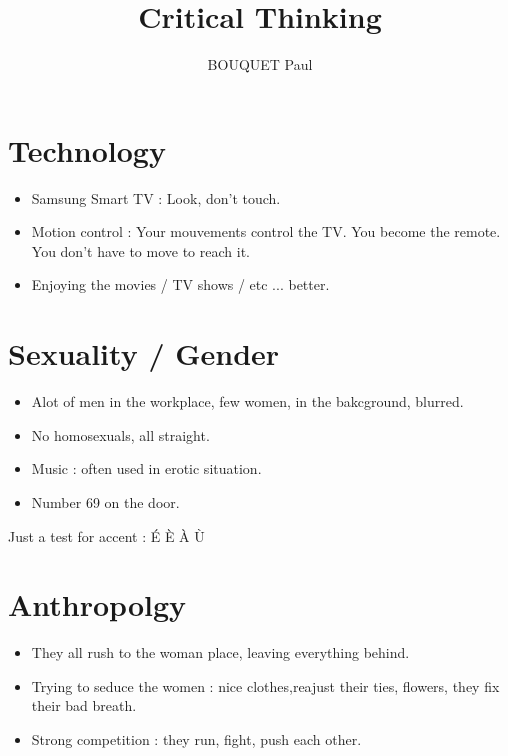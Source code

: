\documentclass{article}
\title{Critical Thinking}
\author{BOUQUET Paul}
\date{\vspace{-5ex}}
\begin{document}
\maketitle

\section{Technology}

\begin{itemize}

\item Samsung Smart TV : Look, don't touch.

\item Motion control : Your mouvements control the TV. You become the remote.
You don't have to move to reach it.

\item Enjoying the movies / TV shows / etc ... better.

\end{itemize}

\section{Sexuality / Gender}

\begin{itemize}

\item Alot of men in the workplace, few women, in the bakcground, blurred.

\item No homosexuals, all straight.

\item Music : often used in erotic situation.

\item Number 69 on the door.

\end{itemize}

Just a test for accent : É È À Ù

\section{Anthropolgy}

\begin{itemize}

\item They all rush to the woman place, leaving everything behind.

\item Trying to seduce the women : nice clothes,reajust their ties, flowers, they fix their bad breath.

\item Strong competition : they run, fight, push each other.

\end{itemize}
\end{document}
